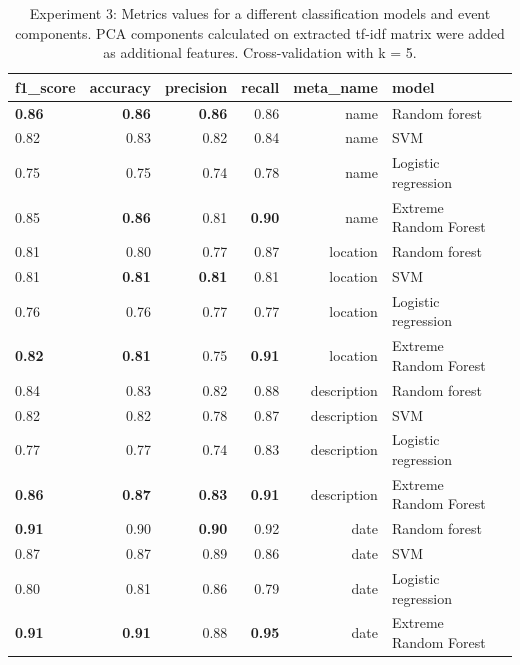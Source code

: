 

\begin{table}[h]
\begin{center}
{\renewcommand{\arraystretch}{1.2}
\begin{tabular}{lrrrrll}
\toprule
f1\_score &  accuracy &  precision &  recall &    meta\_name &                  model \\
\midrule
\textbf{0.86} &           \textbf{0.86} &       \textbf{0.86} &    0.86 &         name &          Random forest \\
0.82 &           0.83 &       0.82 &    0.84 &         name &                    SVM \\
0.75 &           0.75 &       0.74 &    0.78 &         name &    Logistic regression \\
0.85 &           \textbf{0.86} &       0.81 &    \textbf{0.90} &         name &  Extreme Random Forest \\
\midrule
0.81 &           0.80 &       0.77 &    0.87 &     location &          Random forest \\
0.81 &           \textbf{0.81} &       \textbf{0.81} &    0.81 &     location &                    SVM \\
0.76 &           0.76 &       0.77 &    0.77 &     location &    Logistic regression \\
\textbf{0.82} &           \textbf{0.81} &       0.75 &    \textbf{0.91} &     location &  Extreme Random Forest \\
\midrule
0.84 &           0.83 &       0.82 &    0.88 &  description &          Random forest \\
0.82 &           0.82 &       0.78 &    0.87 &  description &                    SVM \\
0.77 &           0.77 &       0.74 &    0.83 &  description &    Logistic regression \\
\textbf{0.86} &           \textbf{0.87} &       \textbf{0.83} &    \textbf{0.91} &  description &  Extreme Random Forest \\
\midrule
\textbf{0.91} &           0.90 &       \textbf{0.90} &    0.92 &         date &          Random forest \\
0.87 &           0.87 &       0.89 &    0.86 &         date &                    SVM \\
0.80 &           0.81 &       0.86 &    0.79 &         date &    Logistic regression \\
\textbf{0.91} &           \textbf{0.91} &       0.88 &    \textbf{0.95} &         date &  Extreme Random Forest \\
\bottomrule
\end{tabular}}
\caption{Experiment 3: Metrics values for a different classification models and event components. PCA components calculated on extracted tf-idf matrix were added as additional features. Cross-validation with k = 5.}
\label{table:sumresultPCA}
\end{center}
\end{table} 

